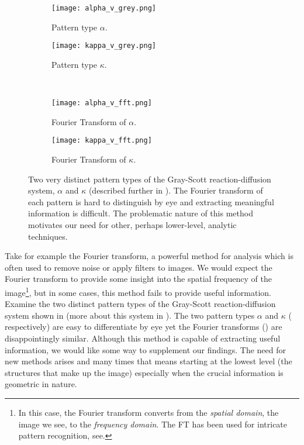 \begin{figure}[h]
        \centering
        \begin{subfigure}[b]{0.35\textwidth}
        	\centering
                \texttt{[image: alpha\_v\_grey.png]}
                \caption{Pattern type $\alpha$.}
                \label{fig:alphagrey_fft}
        \end{subfigure}
        \begin{subfigure}[b]{0.35\textwidth}
        	\centering
                \texttt{[image: kappa\_v\_grey.png]}
                \caption{Pattern type $\kappa$.}
                \label{fig:kappagrey_fft}
        \end{subfigure} \\
        
        \begin{subfigure}[b]{0.35\textwidth}
        	\centering
                \texttt{[image: alpha\_v\_fft.png]}
                \caption{Fourier Transform of $\alpha$.}
                \label{fig:alphafft}
        \end{subfigure}
        \begin{subfigure}[b]{0.35\textwidth}
        	\centering
                \texttt{[image: kappa\_v\_fft.png]}
                \caption{Fourier Transform of $\kappa$.}
                \label{fig:kappafft}
        \end{subfigure}
        \caption{Two very distinct pattern types of the Gray-Scott reaction-diffusion system, $\alpha$ and $\kappa$ (described further in ). The Fourier transform of each pattern is hard to distinguish by eye and extracting meaningful information is difficult. The problematic nature of this method motivates our need for other, perhaps lower-level, analytic techniques.}\label{fig:fourierfail}
\end{figure}

	Take for example the Fourier transform, a powerful method for analysis which is often used to remove noise or apply filters to images. We would expect the Fourier transform to provide some insight into the spatial frequency of the image\footnote{In this case, the Fourier transform converts from the \textit{spatial domain}, the image we see, to the \textit{frequency domain}. The FT has been used for intricate pattern recognition, see.}, but in some cases, this method fails to provide useful information. Examine the two distinct pattern types of the Gray-Scott reaction-diffusion system shown in  (more about this system in ). The two pattern types $\alpha$ and $\kappa$ ( respectively) are easy to differentiate by eye yet the Fourier transforms () are disappointingly similar. Although this method is capable of extracting useful information, we would like some way to supplement our findings. The need for new methods arises and many times that means starting at the lowest level (\ie the structures that make up the image) especially when the crucial information is geometric in nature.
	
